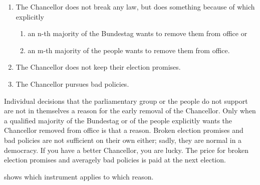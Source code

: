 \begin{enumerate}
    \item The Chancellor does not break any law, but does something because of which explicitly
        \begin{enumerate}[label=\alph*)]
            \item an n-th majority of the Bundestag wants to remove them from office or
            \item an m-th majority of the people wants to remove them from office.
        \end{enumerate}
    \item The Chancellor does not keep their election promises.
    \item The Chancellor pursues bad policies.
\end{enumerate}

Individual decisions that the parliamentary group or the people do not support are not in themselves a reason for the early removal of the Chancellor.
Only when a qualified majority of the Bundestag or of the people explicitly wants the Chancellor removed from office is that a reason.
Broken election promises and bad policies are not sufficient on their own either; sadly, they are normal in a democracy.
If you have a better Chancellor, you are lucky.
The price for broken election promises and averagely bad policies is paid at the next election.

 shows which instrument applies to which reason.


